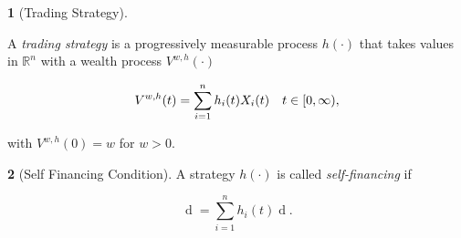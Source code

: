 \documentclass[british]{amsart} \usepackage{lmodern}
\numberwithin{equation}{section} \numberwithin{figure}{section}
\theoremstyle{plain} \newtheorem{thm}{\protect\theoremname}[section]
\theoremstyle{definition} \newtheorem{defn}[thm]{\protect\definitionname}
\theoremstyle{plain} \newtheorem{assumption}[thm]{\protect\assumptionname}
\theoremstyle{plain} \newtheorem{lem}[thm]{\protect\lemmaname}
\theoremstyle{plain} \newtheorem{prop}[thm]{\protect\propositionname}
\theoremstyle{remark} \newtheorem{rem}[thm]{\protect\remarkname}
\theoremstyle{plain} \newtheorem{cor}[thm]{\protect\corollaryname}
\renewcommand{\d}[1]{\mathop{\mathrm{d}{#1}}}
\newcommand{\abs}[1]{\mathop{|{#1}|}} \newcommand{\market}{\mathcal{M}}
\begin{document}
\begin{defn} [Trading Strategy]
  \label{def:tradingstrategy}

  A \textit{trading strategy} is a progressively measurable process $h(\cdot)$
  that takes values in $\mathbb{R}^{n}$ with a wealth process $V^{w,h}(\cdot)$ 

  \begin{equation*}
    V^{w,h}(t) = \sum_{i=1}^{n} h_{i}(t) X_{i}(t) 
    \quad t\in[0,\infty),
  \end{equation*}

  with $V^{w,h}(0)=w$ for $w > 0$. 


%

\end{defn}

\begin{defn} [Self Financing Condition]
  \label{def:selffinancingcondition}  
  A strategy $h(\cdot)$ is called \textit{self-financing} if 

  \begin{equation}
    \d{V^{w,h}(t)} = \sum_{i=1}^{n} h_{i}(t) \d{X_{i}(t)}.
  \end{equation}


\end{defn}
\end{document}
